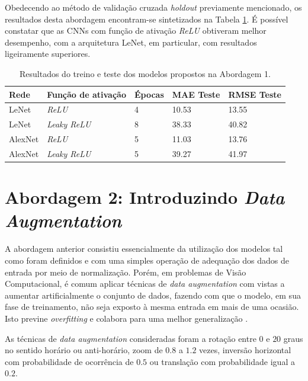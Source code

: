 	Obedecendo ao método de validação cruzada \emph{holdout} previamente mencionado, os resultados desta abordagem encontram-se sintetizados na Tabela \ref{tab:results-1}. É possível constatar que as CNNs com função de ativação \emph{ReLU} obtiveram melhor desempenho, com a arquitetura LeNet, em particular, com resultados ligeiramente superiores.

  \begin{table}[!ht]
		\caption{Resultados do treino e teste dos modelos propostos na Abordagem 1.}
		\label{tab:results-1}
		\begin{center}
			\begin{tabular}{l l l l l}
				\toprule
				Rede & Função de ativação & Épocas & MAE Teste & RMSE Teste \\
				\midrule
				LeNet & \emph{ReLU}  & 4 & 10.53 & 13.55 \\
				LeNet & \emph{Leaky ReLU} & 8 & 38.33 & 40.82 \\
				AlexNet & \emph{ReLU}  & 5 & 11.03 & 13.76 \\
				AlexNet & \emph{Leaky ReLU} & 5 & 39.27 & 41.97 \\
				\bottomrule
			\end{tabular}
		\end{center}
	\end{table}

\section{Abordagem 2: Introduzindo \emph{Data Augmentation}}%

	A abordagem anterior consistiu essencialmente da utilização dos modelos tal como foram definidos e com uma simples operação de adequação dos dados de entrada por meio de normalização. Porém, em problemas de Visão Computacional, é comum aplicar técnicas de \emph{data augmentation} com vistas a aumentar artificialmente o conjunto de dados, fazendo com que o modelo, em sua fase de treinamento, não seja exposto à mesma entrada em mais de uma ocasião. Isto previne \emph{overfitting} e colabora para uma melhor generalização \cite{chollet2017deep}.

	As técnicas de \emph{data augmentation} consideradas foram a rotação entre $0$ e $20$ graus no sentido horário ou anti-horário, zoom de $0.8$ a $1.2$ vezes, inversão horizontal com probabilidade de ocorrência de $0.5$ ou translação com probabilidade igual a $0.2$.

